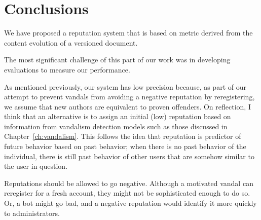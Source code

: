 \section{Conclusions}


We have proposed a reputation system that is
based on metric derived from the content evolution
of a versioned document.

The most significant challenge of this part of our work
was in developing evaluations to measure our performance.

As mentioned previously, our system has low precision because,
as part of our attempt to prevent vandals from avoiding a
negative reputation by reregistering,
we assume that new authors are equivalent to proven offenders.
On reflection, I think that an alternative is to assign an
initial (low) reputation based on information from vandalism
detection models such as those discussed in Chapter~\ref{ch:vandalism}.
This follows the idea that reputation is predictor of future
behavior based on past behavior; when there is no past behavior
of the individual, there is still past behavior of other users
that are somehow similar to the user in question.

Reputations should be allowed to go negative.
Although a motivated vandal can reregister for a fresh account,
they might not be sophisticated enough to do so.
Or, a bot might go bad, and a negative reputation
would identify it more quickly to administrators.

